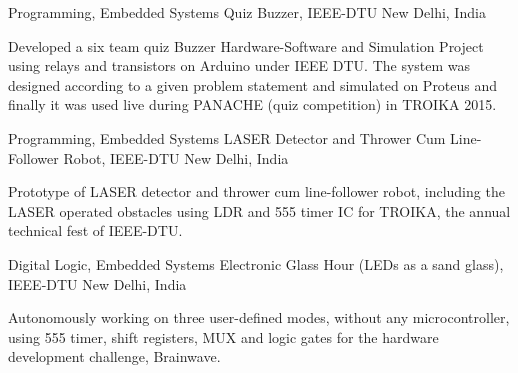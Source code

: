 \begin{cventries}

\cventry
{Programming, Embedded Systems} %
{Quiz Buzzer, IEEE-DTU} %
{New Delhi, India} %
{} %
{ %
 \begin{cvitems}
 \item {Developed a six team quiz Buzzer Hardware-Software and Simulation Project using relays and transistors on Arduino under IEEE DTU. The system was designed according to a given problem statement and simulated on Proteus and finally it was used live during PANACHE (quiz competition) in TROIKA 2015.}
 \end{cvitems}
}


\cventry
{Programming, Embedded Systems } %
{LASER Detector and Thrower Cum Line-Follower Robot, IEEE-DTU} %
{New Delhi, India} %
{} %
{ %
 \begin{cvitems}
 \item {Prototype of LASER detector and thrower cum line-follower robot, including the LASER operated obstacles using LDR and 555 timer IC for TROIKA, the annual technical fest of IEEE-DTU.}
 \end{cvitems}
}


\cventry
{Digital Logic, Embedded Systems } %
{Electronic Glass Hour (LEDs as a sand glass), IEEE-DTU} %
{New Delhi, India} %
{} %
{ %
 \begin{cvitems}
 \item {Autonomously working on three user-defined modes, without any microcontroller, using 555 timer, shift registers, MUX and logic gates for the hardware development challenge, Brainwave.}
 \end{cvitems}
}




\end{cventries}